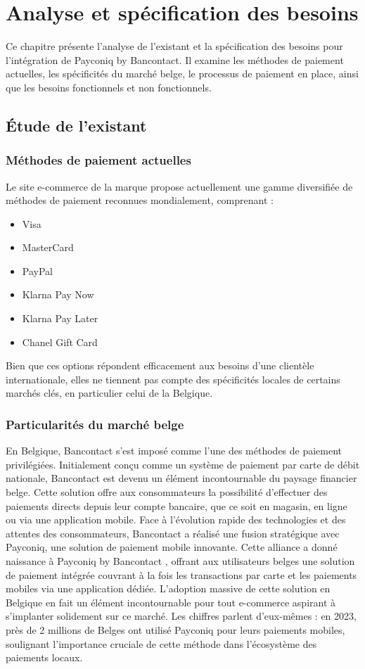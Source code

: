 
\chapter{Analyse et spécification des besoins}
\label{chap:Analyse et spécification des besoins}

Ce chapitre présente l'analyse de l'existant et la spécification des besoins pour l'intégration de Payconiq by Bancontact. Il examine les méthodes de paiement actuelles, les spécificités du marché belge, le processus de paiement en place, ainsi que les besoins fonctionnels et non fonctionnels.
\pagebreak

\section{Étude de l’existant}
\subsection{Méthodes de paiement actuelles}
Le site e-commerce de la marque propose actuellement une gamme diversifiée de méthodes de paiement reconnues mondialement, comprenant :
\begin{itemize}
    \item Visa
    \item MasterCard
    \item PayPal
    \item Klarna Pay Now
    \item Klarna Pay Later
    \item Chanel Gift Card
\end{itemize}
Bien que ces options répondent efficacement aux besoins d'une clientèle internationale, elles ne tiennent pas compte des spécificités locales de certains marchés clés, en particulier celui de la Belgique.
\subsection{Particularités du marché belge}
En Belgique, Bancontact s'est imposé comme l'une des méthodes de paiement privilégiées. Initialement conçu comme un système de paiement par carte de débit nationale, Bancontact est devenu un élément incontournable du paysage financier belge. Cette solution offre aux consommateurs la possibilité d'effectuer des paiements directs depuis leur compte bancaire, que ce soit en magasin, en ligne ou via une application mobile.
Face à l'évolution rapide des technologies et des attentes des consommateurs, Bancontact a réalisé une fusion stratégique avec Payconiq, une solution de paiement mobile innovante. Cette alliance a donné naissance à Payconiq by Bancontact , offrant aux utilisateurs belges une solution de paiement intégrée couvrant à la fois les transactions par carte et les paiements mobiles via une application dédiée.
L'adoption massive de cette solution en Belgique en fait un élément incontournable pour tout e-commerce aspirant à s'implanter solidement sur ce marché. Les chiffres parlent d'eux-mêmes : en 2023, près de 2 millions de Belges \cite{Belge} ont utilisé Payconiq pour leurs paiements mobiles, soulignant l'importance cruciale de cette méthode dans l'écosystème des paiements locaux.
